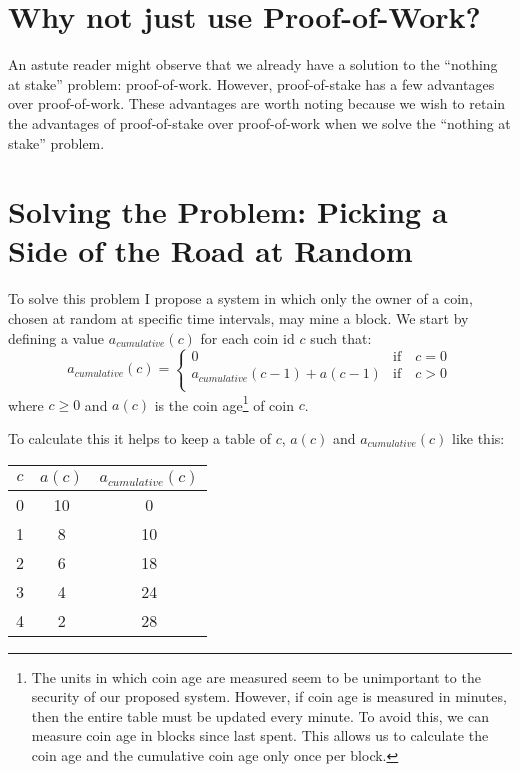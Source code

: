 \documentclass{article}
\begin{document}
\section{Why not just use Proof-of-Work?}

An astute reader might observe that we already have a solution to the ``nothing at stake'' problem: proof-of-work. However, proof-of-stake has a few advantages over proof-of-work. These advantages are worth noting because we wish to retain the advantages of proof-of-stake over proof-of-work when we solve the ``nothing at stake'' problem.

\section{Solving the Problem: Picking a Side of the Road at Random}

To solve this problem I propose a system in which only the owner of a coin, chosen at random at specific time intervals, may mine a block. We start by defining a value \(a_{cumulative}(c)\) for each coin id \(c\) such that:
\[
	a_{cumulative}(c) =
	\begin{cases}
		0 																& \mathrm{ if } \quad c = 0 \\
		a_{cumulative}(c - 1) + a(c - 1) 	& \mathrm{ if } \quad c > 0 \\
	\end{cases}
\]
where \(c \geq 0\) and \(a(c)\) is the coin age\footnote{The units in which coin age are measured seem to be unimportant to the security of our proposed system. However, if coin age is measured in minutes, then the entire table must be updated every minute. To avoid this, we can measure coin age in blocks since last spent. This allows us to calculate the coin age and the cumulative coin age only once per block.} of coin \(c\).

To calculate this it helps to keep a table of \(c\), \(a(c)\) and \(a_{cumulative}(c)\) like this:
\begin{center}
  \begin{tabular}{ c | c | c }
    \(c\) & \(a(c)\) & \(a_{cumulative}(c)\) \\ \hline
    0 & 10 & 0 \\
    1 & 8 & 10 \\
    2 & 6 & 18 \\
		3 & 4 & 24 \\
		4 & 2 & 28 \\
  \end{tabular}
\end{center}
\end{document}
